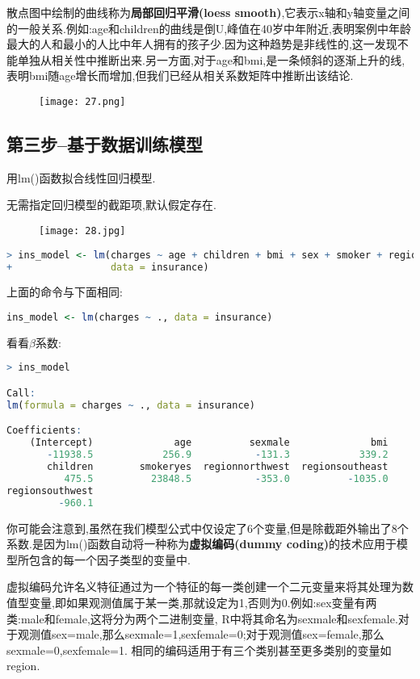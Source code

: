 \documentclass[11pt,a4paper,oneside]{book}
\begin{document}
散点图中绘制的曲线称为\textbf{局部回归平滑(loess smooth)},它表示x轴和y轴变量之间的一般关系.例如:age和children的曲线是倒U,峰值在40岁中年附近,表明案例中年龄最大的人和最小的人比中年人拥有的孩子少.因为这种趋势是非线性的,这一发现不能单独从相关性中推断出来.另一方面,对于age和bmi,是一条倾斜的逐渐上升的线,表明bmi随age增长而增加,但我们已经从相关系数矩阵中推断出该结论.
\begin{figure}[H]
	\centering
	\texttt{[image: 27.png]}
\end{figure}

\subsection{第三步--基于数据训练模型}
用lm()函数拟合线性回归模型.

无需指定回归模型的截距项,默认假定存在.
\begin{figure}[H]
	\centering
	\texttt{[image: 28.jpg]}
\end{figure}
\begin{lstlisting}[language=r]
> ins_model <- lm(charges ~ age + children + bmi + sex + smoker + region,
+                 data = insurance)
\end{lstlisting}
上面的命令与下面相同:
\begin{lstlisting}[language=r]
ins_model <- lm(charges ~ ., data = insurance)
\end{lstlisting}
看看$\beta$系数:
\begin{lstlisting}[language=r]
> ins_model

Call:
lm(formula = charges ~ ., data = insurance)

Coefficients:
    (Intercept)              age          sexmale              bmi  
       -11938.5            256.9           -131.3            339.2  
       children        smokeryes  regionnorthwest  regionsoutheast  
          475.5          23848.5           -353.0          -1035.0  
regionsouthwest  
         -960.1  
\end{lstlisting}

你可能会注意到,虽然在我们模型公式中仅设定了6个变量,但是除截距外输出了8个系数.是因为lm()函数自动将一种称为\textbf{虚拟编码(dummy coding)}的技术应用于模型所包含的每一个因子类型的变量中.

虚拟编码允许名义特征通过为一个特征的每一类创建一个二元变量来将其处理为数值型变量,即如果观测值属于某一类,那就设定为1,否则为0.例如:sex变量有两类:male和female,这将分为两个二进制变量, R中将其命名为sexmale和sexfemale.对于观测值sex=male,那么sexmale=1,sexfemale=0;对于观测值sex=female,那么sexmale=0,sexfemale=1.
相同的编码适用于有三个类别甚至更多类别的变量如region.
\end{document}
